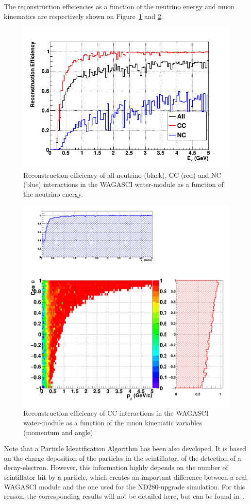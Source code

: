 The reconstruction efficiencies as a function of the neutrino energy and muon kinematics are respectively shown on Figure~\ref{fig:efficiency_enu} and \ref{fig:efficiency_muonkinematics}.
\begin{figure}
  \centering
\includegraphics[width=.7\textwidth]{fig/Efficiency_Enu.png}
  \caption{\label{fig:efficiency_enu} Reconstruction efficiency of all neutrino (black), CC (red) and NC (blue) interactions in the WAGASCI water-module as a function of the neutrino energy.}
\end{figure}
\begin{figure}
  \centering
\includegraphics[width=.7\textwidth]{fig/Efficiency_MuonKinematics.png}
  \caption{\label{fig:efficiency_muonkinematics} Reconstruction efficiency of CC interactions in the WAGASCI water-module as a function of the muon kinematic variables (momentum and angle).}
\end{figure}
\clearpage

Note that a Particle Identification Algorithm has been also developed. It is based on the charge deposition of the particles in the scintillator, of the detection of a decay-electron. However, this information highly depends on the number of scintillator hit by a particle, which creates an important difference between a real WAGASCI module and the one used for the ND280-upgrade simulation. For this reason, the corresponding results will not be detailed here, but can be found in~\cite{ND280Upgrade}.

